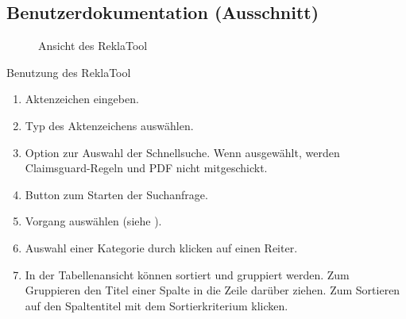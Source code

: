 \subsection{Benutzerdokumentation (Ausschnitt)}
\label{app:BenutzerDoku}
\begin{figure}[htb]
    \centering
    \caption{Ansicht des ReklaTool}
\end{figure}

Benutzung des ReklaTool
\begin{enumerate}
    \item Aktenzeichen eingeben.
    \item Typ des Aktenzeichens auswählen.
    \item Option zur Auswahl der Schnellsuche. Wenn ausgewählt, werden Claimsguard-Regeln und PDF nicht mitgeschickt.
    \item Button zum Starten der Suchanfrage.
    \item Vorgang auswählen (siehe ).
    \item Auswahl einer Kategorie durch klicken auf einen Reiter.
    \item In der Tabellenansicht können sortiert und gruppiert werden. Zum Gruppieren den Titel einer Spalte in die 
    Zeile darüber ziehen. Zum Sortieren auf den Spaltentitel mit dem Sortierkriterium klicken.
\end{enumerate}